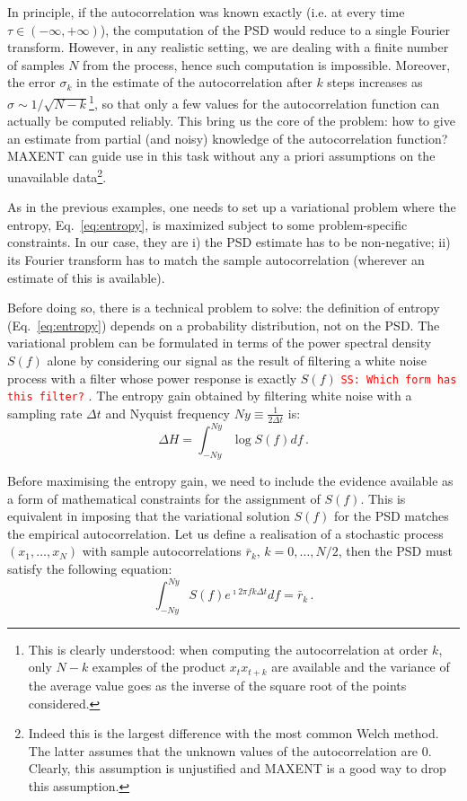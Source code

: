 \documentclass[twocolumn,showpacs,preprintnumbers,nofootinbib,prd,
superscriptaddress,10pt]{revtex4-1}
\newcommand{\sschmidt}[1]{{\textcolor{red}{\texttt{SS: #1}} }}
\begin{document}
In principle, if the autocorrelation was known exactly (i.e. at every time $\tau \in (-\infty,+\infty)$), the computation of the PSD 
would reduce to a single Fourier transform.
However, in any realistic setting, we are dealing with a finite number of samples $N$ from the process, hence such computation
is impossible.
Moreover, the error $\sigma_k$ in the estimate of the autocorrelation after $k$ steps increases as $\sigma \sim 1/\sqrt{N - k}$\footnote{
This is clearly understood: when computing the autocorrelation at order $k$, only $N-k$ examples of the product $x_t x_{t+k}$ are available and the variance of the average value goes as the inverse of the square root of the points considered.
}, so that only a few values for the autocorrelation function can actually be computed reliably.
This bring us the core of the problem: how to give an estimate from partial (and noisy) knowledge of the autocorrelation function? MAXENT can guide use in this task without any a priori assumptions on the unavailable data\footnote{Indeed this is the largest difference with the most common Welch method. The latter assumes that the unknown values of the autocorrelation are $0$. Clearly, this assumption is unjustified and MAXENT is a good way to drop this assumption.}.
\par
As in the previous examples, one needs to set up a variational problem where the entropy, Eq.~\eqref{eq:entropy}, is maximized 
subject to some problem-specific constraints. 
In our case, they are i) the PSD estimate has to be non-negative; ii) its Fourier transform has to match the sample autocorrelation (wherever an estimate of this is available).
\par
Before doing so, there is a technical problem to solve: the definition of entropy (Eq.~\ref{eq:entropy}) depends on a probability distribution, 
not on the PSD. The variational problem can be formulated in terms of the power spectral density $S(f)$ alone by
considering our signal as the result of filtering a white noise process with a filter whose power response is exactly $S(f)$ \cite{AblesMESA} \sschmidt{Which form has this filter?}. 
The entropy gain obtained by filtering white noise with a sampling rate $\Delta t$ and Nyquist frequency $Ny \equiv \frac{1}{2 \Delta t}$ is:
\begin{equation}\label{eq:EntropyGain}
    \Delta H = \int_{- Ny}^{Ny}\log S(f) df\,.
\end{equation}

Before maximising the entropy gain, we need to include the evidence available as a form of mathematical constraints for the assignment of $S(f)$.
This is equivalent in imposing that the variational solution $S(f)$ for the PSD matches the empirical autocorrelation.
Let us define a realisation of a stochastic process $(x_1,\ldots,x_N)$ with sample autocorrelations $\bar r_k,\,k=0,\ldots, N/2$, then the PSD must satisfy the following equation:
\begin{equation}\label{eq:MaxConstraint}
\int_{-Ny}^{Ny} S(f) e^{\imath 2 \pi f k \Delta t} df = \bar r_{k}\,.
\end{equation}
\end{document}
